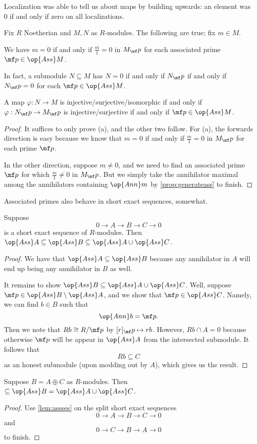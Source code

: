 Localization was able to tell us about maps by building upwards: an element was $0$ if and only if zero on all localizations.
\begin{proposition}
	Fix $R$ Noetherian and $M,N$ as $R$-modules. The following are true; fix $m\in M$.
	\begin{listalph}
		\item We have $m=0$ if and only if $\frac m1=0$ in $M_\mf p$ for each associated prime $\mf p\in\op{Ass}M$.
		\item In fact, a submodule $N\subseteq M$ has $N=0$ if and only if $N_\mf p$ if and only if $N_\mf p=0$ for each $\mf p\in\op{Ass}M$.
		\item A map $\varphi:N\to M$ is injective/surjective/isomorphic if and only if $\varphi:N_\mf p\to M_\mf p$ is injective/surjective if and only if $\mf p\in\op{Ass}M$.
	\end{listalph}
\end{proposition}
\begin{proof}
	It suffices to only prove (a), and the other two follow. For (a), the forwards direction is easy because we know that $m=0$ if and only if $\frac m1=0$ in $M_\mf p$ for each prime $\mf p$.

	In the other direction, suppose $m\ne0$, and we need to find an associated prime $\mf p$ for which $\frac m1\ne0$ in $M_\mf p$. But we simply take the annihilator maximal among the annihilators containing $\op{Ann}m$ by \autoref{prop:generateass} to finish.
\end{proof}
Associated primes also behave in short exact sequences, somewhat.
\begin{lemma} \label{lem:assses}
	Suppose
	\[0\to A\to B\to C\to 0\]
	is a short exact sequence of $R$-modules. Then $\op{Ass}A\subseteq\op{Ass}B\subseteq\op{Ass}A\cup\op{Ass}C$.
\end{lemma}
\begin{proof}
	We have that $\op{Ass}A\subseteq\op{Ass}B$ because any annihilator in $A$ will end up being any annihilator in $B$ as well.

	It remains to show $\op{Ass}B\subseteq\op{Ass}A\cup\op{Ass}C$. Well, suppose $\mf p\in\op{Ass}B\setminus\op{Ass}A$, and we show that $\mf p\in\op{Ass}C$. Namely, we can find $b\in B$ such that
	\[\op{Ann}b=\mf p.\]
	Then we note that $Rb\cong R/\mf p$ by $[r]_\mf p\mapsto rb$. However, $Rb\cap A=0$ because otherwise $\mf p$ will be appear in $\op{Ass}A$ from the intersected submodule. It follows that
	\[Rb\subseteq C\]
	as an honest submodule (upon modding out by $A$), which gives us the result.
\end{proof}
\begin{corollary} \label{cor:dirsumass}
	Suppose $B=A\oplus C$ as $R$-modules. Then $\subseteq\op{Ass}B=\op{Ass}A\cup\op{Ass}C$.
\end{corollary}
\begin{proof}
	Use \autoref{lem:assses} on the split short exact sequences
	\[0\to A\to B\to C\to 0\]
	and
	\[0\to C\to B\to A\to 0\]
	to finish.
\end{proof}

